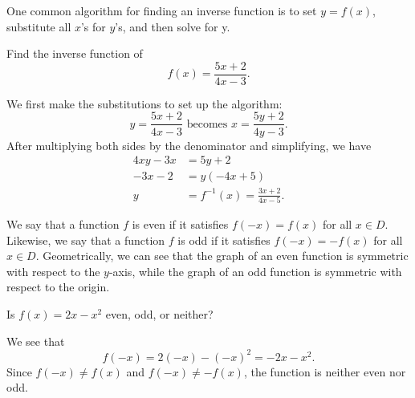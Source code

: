 One common algorithm for finding an inverse function is to set $y = f(x)$, substitute all $x$'s for $y$'s, and then solve for y.
\begin{example}
    Find the inverse function of 
    \begin{equation*}
        f(x) = \frac{5x + 2}{4x - 3}.
    \end{equation*}
\end{example}
\begin{answer}
    We first make the substitutions to set up the algorithm:
    \begin{equation*}
        y = \frac{5x + 2}{4x - 3} \text{ becomes } x = \frac{5y + 2}{4y - 3}.
    \end{equation*}
    After multiplying both sides by the denominator and simplifying, we have
    \begin{align*}
        4xy - 3x &= 5y + 2 \\
        -3x - 2 &= y(-4x + 5) \\
        y &= f^{-1}(x) = \frac{3x + 2}{4x - 5}.
    \end{align*}
\end{answer}

We say that a function $f$ is even if it satisfies $f(-x) = f(x)$ for all $x \in D$.
Likewise, we say that a function $f$ is odd if it satisfies $f(-x) = -f(x)$ for all $x \in D$. 
Geometrically, we can see that the graph of an even function is symmetric with respect to the $y$-axis, while the graph of an odd function is symmetric with respect to the origin. 

\begin{example}
    Is $f(x) = 2x - x^2$ even, odd, or neither?
\end{example}
\begin{answer}
	We see that
    \begin{equation*}
        f(-x) = 2(-x) - (-x)^2 = -2x - x^2.
    \end{equation*}
    Since $f(-x) \neq f(x)$ and $f(-x) \neq -f(x)$, the function is neither even nor odd.
\end{answer}